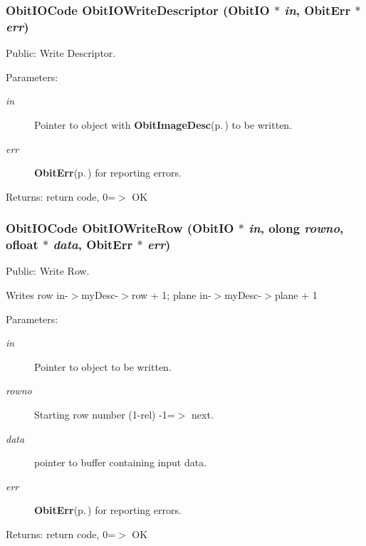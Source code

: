 \subsubsection{\setlength{\rightskip}{0pt plus 5cm}Obit\-IOCode Obit\-IOWrite\-Descriptor ({\bf Obit\-IO} $\ast$ {\em in}, {\bf Obit\-Err} $\ast$ {\em err})}\label{ObitIO_8c_a26}


Public: Write Descriptor. 

\begin{Desc}
\item[Parameters:]
\begin{description}
\item[{\em in}]Pointer to object with {\bf Obit\-Image\-Desc}{\rm (p.\,\pageref{structObitImageDesc})} to be written. \item[{\em err}]{\bf Obit\-Err}{\rm (p.\,\pageref{structObitErr})} for reporting errors. \end{description}
\end{Desc}
\begin{Desc}
\item[Returns:]return code, 0=$>$ OK \end{Desc}
\subsubsection{\setlength{\rightskip}{0pt plus 5cm}Obit\-IOCode Obit\-IOWrite\-Row ({\bf Obit\-IO} $\ast$ {\em in}, {\bf olong} {\em rowno}, {\bf ofloat} $\ast$ {\em data}, {\bf Obit\-Err} $\ast$ {\em err})}\label{ObitIO_8c_a24}


Public: Write Row. 

Writes row in-$>$my\-Desc-$>$row + 1; plane in-$>$my\-Desc-$>$plane + 1 \begin{Desc}
\item[Parameters:]
\begin{description}
\item[{\em in}]Pointer to object to be written. \item[{\em rowno}]Starting row number (1-rel) -1=$>$ next. \item[{\em data}]pointer to buffer containing input data. \item[{\em err}]{\bf Obit\-Err}{\rm (p.\,\pageref{structObitErr})} for reporting errors. \end{description}
\end{Desc}
\begin{Desc}
\item[Returns:]return code, 0=$>$ OK \end{Desc}

